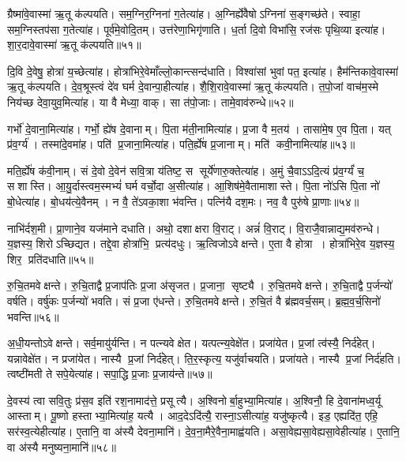ग्रैष्मा॑वे॒वास्मा॑ ऋ॒तू क॑ल्पयति। सम॒ग्निर॒ग्निना॑ ग॒तेत्या॑ह। अ॒ग्निर्ह्ये॑वैषोऽग्निना॑ स॒ङ्गच्छ॑ते। स्वाहा॒ सम॒ग्निस्तप॑सा ग॒तेत्या॑ह। पूर्व॑मे॒वोदि॒तम्। उत्त॑रेणा॒भिगृ॑णाति। ध॒र्ता दि॒वो विभा॑सि॒ रज॑सः पृथि॒व्या इत्या॑ह। शा॒र॒दावे॒वास्मा॑ ऋ॒तू क॑ल्पयति॥५१॥

दि॒वि दे॒वेषु॒ होत्रा॑ य॒च्छेत्या॑ह। होत्रा॑भिरे॒वेमाँल्लो॒कान्त्सन्द॑\-धाति। विश्वा॑सां भुवां पत॒ इत्या॑ह। हैम॑न्तिकावे॒वास्मा॑ ऋ॒तू क॑ल्पयति। दे॒व॒श्रूस्त्वं दे॑व घर्म दे॒वान्पा॒हीत्या॑ह। शै॒शि॒रावे॒वास्मा॑ ऋ॒तू क॑ल्पयति। त॒पो॒जां वाच॑म॒स्मे निय॑च्छ देवा॒युव॒मित्या॑ह। या वै मेध्या॒ वाक्। सा त॑पो॒जाः। तामे॒वाव॑रुन्धे॥५२॥

गर्भो॑ दे॒वाना॒मित्या॑ह। गर्भो॒ ह्ये॑ष दे॒वानाम्। पि॒ता म॑ती॒नामित्या॑ह। प्र॒जा वै म॒तय॑। तासा॑मे॒ष ए॒व पि॒ता। यत् प्र॑व॒र्ग्य॑। तस्मा॑दे॒वमा॑ह। पति॑ प्र॒जाना॒मित्या॑ह। पति॒र्ह्ये॑ष प्र॒जानाम्। मति॑ कवी॒नामित्या॑ह॥५३॥

मति॒र्ह्ये॑ष क॑वी॒नाम्। सं दे॒वो दे॒वेन॑ सवि॒त्रा य॑तिष्ट॒ स सूर्ये॑णारु॒क्तेत्या॑ह। अ॒मुं चै॒वाऽऽदि॒त्यं प्र॑व॒र्ग्यं॑ च॒ सशास्ति। आ॒यु॒र्दास्त्वम॒स्मभ्यं॑ घर्म वर्चो॒दा अ॒सीत्या॑ह। आ॒शिष॑मे॒वैतामाशास्ते। पि॒ता नो॑ऽसि पि॒ता नो॑ बो॒धेत्या॑ह। बो॒धय॑त्ये॒वैनम्। न वै॒ ते॑ऽवका॒शा भ॑वन्ति। पत्नि॑यै दश॒मः। नव॒ वै पुरु॑षे प्रा॒णाः॥५४॥

नाभि॑र्दश॒मी। प्रा॒णाने॒व यज॑माने दधाति। अथो॒ दशाक्षरा वि॒राट्। अन्नं॑  वि॒राट्। वि॒राजै॒वान्नाद्य॒मव॑रुन्धे। य॒ज्ञस्य॒ शिरोऽच्छिद्यत। तद्दे॒वा होत्रा॑भि॒ प्रत्य॑दधुः। ऋ॒त्विजोऽवेक्षन्ते। ए॒ता वै होत्रा। होत्रा॑भिरे॒व य॒ज्ञस्य॒ शिर॒ प्रति॑दधाति॥५५॥

रु॒चि॒तमवेक्षन्ते। रु॒चि॒ताद्वै प्र॒जाप॑तिः प्र॒जा अ॑सृजत। प्र॒जाना॒ सृष्ट्यै। रु॒चि॒तमवेक्षन्ते। रु॒चि॒ताद्वै प॒र्जन्यो॑ वर्\mbox{}षति। वर्\mbox{}षु॑कः प॒र्जन्यो॑ भवति। सं प्र॒जा ए॑धन्ते। रु॒चि॒तमवेक्षन्ते। रु॒चि॒तं वै ब्र॑ह्मवर्च॒सम्। ब्र॒ह्म॒व॒र्च॒सिनो॑ भवन्ति॥५६॥

अ॒धी॒यन्तोऽवेक्षन्ते। सर्व॒मायु॑र्\mbox{}यन्ति। न पत्न्यवेक्षेत। यत्पत्न्य॒वेक्षे॑त। प्रजा॑येत। प्र॒जां त्व॑स्यै॒ निर्द॑हेत्। यन्नावेक्षे॑त। न प्रजा॑येत। नास्यै प्र॒जां निर्द॑हेत्। ति॒र॒स्कृत्य॒ यजु॑र्वाचयति। प्रजा॑यते। नास्यै प्र॒जां निर्द॑हति। त्वष्टी॑मती ते सपे॒येत्या॑ह। सपा॒द्धि प्र॒जाः प्र॒जाय॑न्ते॥५७॥

दे॒वस्य॑ त्वा सवि॒तुः प्र॑स॒व इति॑ रश॒नामाद॑त्ते॒ प्रसूत्यै। अ॒श्विनोर्बा॒हुभ्या॒मित्या॑ह। अ॒श्विनौ॒ हि दे॒वाना॑मध्व॒र्यू आस्ताम्। पू॒ष्णो हस्ताभ्या॒मित्या॑ह॒ यत्यै। आद॒देऽदि॑त्यै॒ रास्ना॒ऽसीत्या॑ह॒ यजु॑ष्कृत्यै। इड॒ एह्यदि॑त॒ एहि॒ सर॑स्व॒त्येहीत्या॑ह। ए॒तानि॒ वा अ॑स्यै देवना॒मानि॑। दे॒व॒ना॒मैरे॒वैना॒माह्व॑यति। असा॒वेह्यसा॒वेह्यसा॒वेहीत्या॑ह। ए॒तानि॒ वा अ॑स्यै मनुष्यना॒मानि॑॥५८॥

